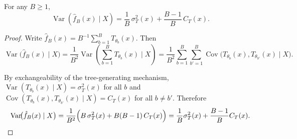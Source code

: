 \documentclass[10pt,a4paper]{amsart}
\DeclareMathOperator{\Cov}{Cov}
\DeclareMathOperator{\Var}{Var}
\begin{document}
\begin{theorem}
	\label{thm:finite_var}
	For any $B \ge 1$,
	\[
	\Var\!\left(\hat f_B(x)\mid X\right)
	=
	\frac{1}{B}\,\sigma_T^2(x)
	+
	\frac{B-1}{B}\,C_T(x).
	\]
\end{theorem}

\begin{proof}
	Write $\hat f_B(x)=B^{-1}\sum_{b=1}^B T_{\theta_b}(x)$. Then
	\[
	\Var\!\bigl(\hat f_B(x)\mid X\bigr)
	=
	\frac{1}{B^2}\Var\!\left(\sum_{b=1}^B T_{\theta_b}(x)\mid X\right)
	=
	\frac{1}{B^2}\sum_{b=1}^B\sum_{b'=1}^B
	\Cov\!\bigl(T_{\theta_b}(x),T_{\theta_{b'}}(x)\mid X\bigr).
	\]
	
	By exchangeability of the tree-generating mechanism,
	$\Var(T_{\theta_b}(x)\mid X)=\sigma_T^2(x)$ for all $b$
	and $\Cov(T_{\theta_b}(x),T_{\theta_{b'}}(x)\mid X)=C_T(x)$ for all $b\neq b'$.
	Therefore
	\[
	\Var\!\bigl(\hat f_B(x)\mid X\bigr)
	=
	\frac{1}{B^2}\Bigl(B\,\sigma_T^2(x)+B(B-1)\,C_T(x)\Bigr)
	=
	\frac{1}{B}\sigma_T^2(x)+\frac{B-1}{B}C_T(x).
	\]
\end{proof}
\end{document}
